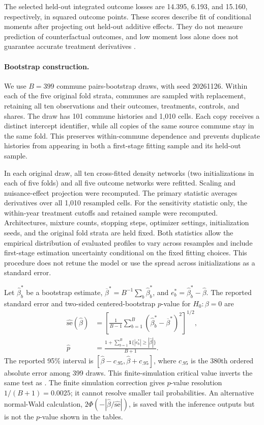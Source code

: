 \documentclass{article}
\begin{document}
The selected held-out integrated outcome losses are 14.395, 6.193, and 15.160, respectively, in squared outcome points. These scores describe fit of conditional moments after projecting out held-out additive effects. They do not measure prediction of counterfactual outcomes, and low moment loss alone does not guarantee accurate treatment derivatives \cite[Section 3.2]{deepiv}.

\paragraph{Bootstrap construction.}
We use $B=399$ commune pairs-bootstrap draws, with seed 20261126. Within each of the five original fold strata, communes are sampled with replacement, retaining all ten observations and their outcomes, treatments, controls, and shares. The draw has 101 commune histories and 1,010 cells. Each copy receives a distinct intercept identifier, while all copies of the same source commune stay in the same fold. This preserves within-commune dependence and prevents duplicate histories from appearing in both a first-stage fitting sample and its held-out sample.

In each original draw, all ten cross-fitted density networks (two initializations in each of five folds) and all five outcome networks were refitted. Scaling and nuisance-effect projection were recomputed. The primary statistic averages derivatives over all 1,010 resampled cells. For the sensitivity statistic only, the within-year treatment cutoffs and retained sample were recomputed. Architectures, mixture counts, stopping steps, optimizer settings, initialization seeds, and the original fold strata are held fixed. Both statistics allow the empirical distribution of evaluated profiles to vary across resamples and include first-stage estimation uncertainty conditional on the fixed fitting choices. This procedure does not retune the model or use the spread across initializations as a standard error.

Let $\widehat\beta_b^*$ be a bootstrap estimate, $\overline\beta^*=B^{-1}\sum_b\widehat\beta_b^*$, and $e_b^*=\widehat\beta_b^*-\widehat\beta$. The reported standard error and two-sided centered-bootstrap $p$-value for $H_0:\beta=0$ are
\begin{align}
\widehat{\mathrm{se}}(\widehat\beta)
&=\left[\frac{1}{B-1}\sum_{b=1}^{B}
(\widehat\beta_b^*-\overline\beta^*)^2\right]^{1/2},\\
\widehat p
&=\frac{1+\sum_{b=1}^{B}\mathbf1\{|e_b^*|\geq|\widehat\beta|\}}{B+1}.
\label{eq:neural-bootstrap-p}
\end{align}
The reported 95\% interval is $[\widehat\beta-c_{.95},\widehat\beta+c_{.95}]$, where $c_{.95}$ is the 380th ordered absolute error among 399 draws. This finite-simulation critical value inverts the same test as .
The finite simulation correction gives $p$-value resolution $1/(B+1)=0.0025$; it cannot resolve smaller tail probabilities. An alternative normal-Wald calculation, $2\Phi(-|\widehat\beta/\widehat{\mathrm{se}}|)$, is saved with the inference outputs but is not the $p$-value shown in the tables.
\end{document}
